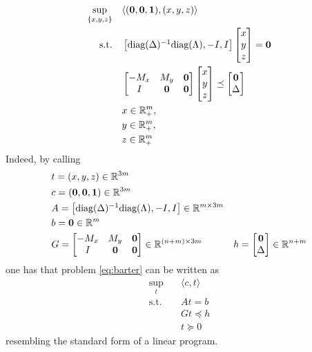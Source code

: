 \documentclass{article}
\begin{document}
\begin{equation}\label{eq:barter}
\begin{aligned}
        \sup_{\{x, y, z\}} \quad& \langle (\text{\textbf{0}},\text{\textbf{0}},\text{\textbf{1}}), (x,y,z) \rangle\\
        \text{s.t.} 
        \quad& \begin{bmatrix}\text{diag}(\Delta)^{-1} \text{diag}(\Lambda) , -I, I\end{bmatrix} \begin{bmatrix}
            x\\
            y\\
            z
        \end{bmatrix}=\text{\textbf{0}}\\
        \quad&\begin{bmatrix}
            -M_x & M_y & \text{\textbf{0}}\\
            I & \text{\textbf{0}} & \text{\textbf{0}}
        \end{bmatrix} \begin{bmatrix}
            x\\
            y\\
            z
        \end{bmatrix} \preceq \begin{bmatrix}
            \text{\textbf{0}}\\
            \Delta
        \end{bmatrix}\\
        \quad& x \in \mathbb{R}^m_+,\\
        \quad& y \in \mathbb{R}^m_+,\\
        \quad& z \in \mathbb{R}^m_+
\end{aligned}
\end{equation}
Indeed, by calling 
\begin{align*}
    &t=(x,y,z)\in\mathbb{R}^{3m}\\
    &c=(\text{\textbf{0}},\text{\textbf{0}},\text{\textbf{1}}) \in \mathbb{R}^{3m}\\
    &A=\begin{bmatrix}\text{diag}(\Delta)^{-1} \text{diag}(\Lambda) , -I, I\end{bmatrix} \in \mathbb{R}^{m\times 3m}\\
    &b=\text{\textbf{0}} \in \mathbb{R}^m\\
    &G=\begin{bmatrix}
        -M_x & M_y & \text{\textbf{0}}\\
        I & \text{\textbf{0}} & \text{\textbf{0}}
    \end{bmatrix} \in \mathbb{R}^{(n+m)\times 3m}
    &h=\begin{bmatrix}
        \text{\textbf{0}}\\
        \Delta
    \end{bmatrix} \in \mathbb{R}^{n+m}
\end{align*}
one has that problem \eqref{eq:barter} can be written as
\begin{align*}
    \sup_{t} \quad& \langle c, t \rangle\\
    \text{s.t.} \quad& A t = b\\
    \quad& G t \preceq h\\
    \quad&t\succeq 0
\end{align*}
resembling the standard form of a linear program.
\end{document}
